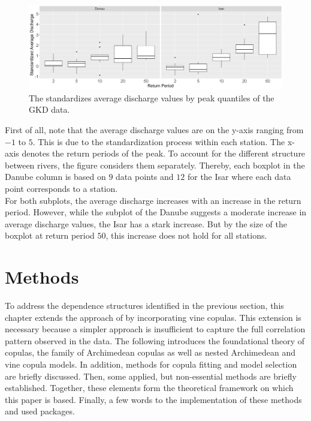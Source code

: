 \documentclass[
]{krantz}
\begin{document}
\begin{figure}

{\centering \includegraphics[width=0.7\linewidth]{work/04-floodfreq/figures/data_condBoxplots} 

}

\caption{The standardizes average discharge values by peak quantiles of the GKD data.}\label{fig:condEmpBoxplots}
\end{figure}

First of all, note that the average discharge values are on the
y-axis ranging from \(-1\) to \(5\). This is due to the
standardization process within each station. The x-axis denotes the
return periods of the peak.
To account for the different structure between rivers, the figure considers them separately.
Thereby, each boxplot in the Danube column is based on \(9\) data points and \(12\) for the Isar where each data
point corresponds to a station.\\
For both subplots, the average discharge increases with an increase in the return period.
However, while the subplot of the Danube suggests a moderate increase in average discharge values,
the Isar has a stark increase. But by the size of the boxplot at return period \(50\), this increase does not
hold for all stations.

\section{Methods}\label{methods_ff}

To address the dependence structures identified in the previous section,
this chapter
extends the approach of \citet{grimaldi2006} by incorporating vine copulas.
This extension is necessary because a simpler approach is insufficient to capture the full correlation pattern
observed in the data.
The following introduces the foundational theory of copulas,
the family of Archimedean copulas as well as nested Archimedean and vine copula models.
In addition, methods for copula fitting and model selection are briefly discussed.
Then, some applied, but non-essential methods are briefly established.
Together, these elements form the theoretical framework on which this paper is based.
Finally, a few words to the implementation of these methods and used packages.
\end{document}
